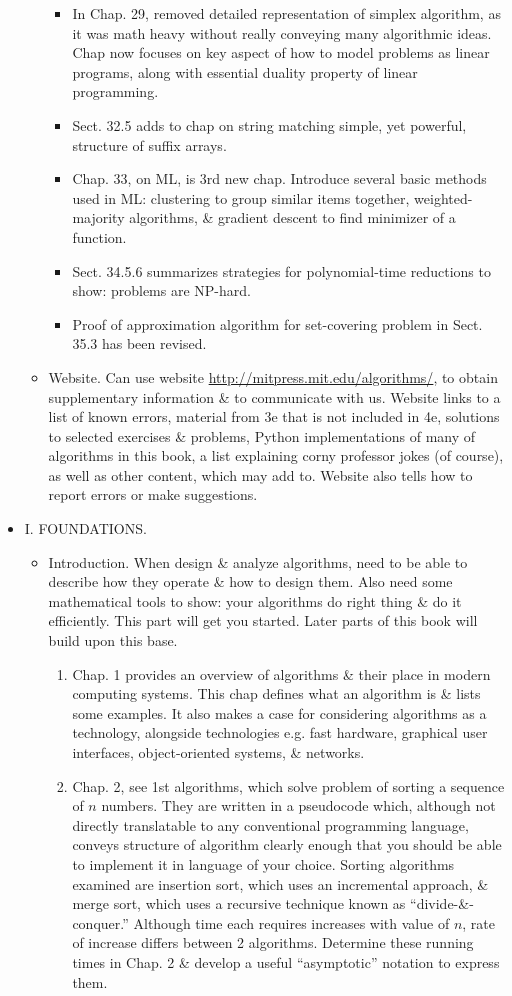 \documentclass{article}
\begin{document}
\begin{itemize}
\begin{itemize}
\begin{itemize}
			\item In Chap. 29, removed detailed representation of simplex algorithm, as it was math heavy without really conveying many algorithmic ideas. Chap now focuses on key aspect of how to model problems as linear programs, along with essential duality property of linear programming.
			\item Sect. 32.5 adds to chap on string matching simple, yet powerful, structure of suffix arrays.
			\item Chap. 33, on ML, is 3rd new chap. Introduce several basic methods used in ML: clustering to group similar items together, weighted-majority algorithms, \& gradient descent to find minimizer of a function.
			\item Sect. 34.5.6 summarizes strategies for polynomial-time reductions to show: problems are NP-hard.
			\item Proof of approximation algorithm for set-covering problem in Sect. 35.3 has been revised.
		\end{itemize}
		\item {\sf Website.} Can use website \url{http://mitpress.mit.edu/algorithms/}, to obtain supplementary information \& to communicate with us. Website links to a list of known errors, material from 3e that is not included in 4e, solutions to selected exercises \& problems, Python implementations of many of algorithms in this book, a list explaining corny professor jokes (of course), as well as other content, which may add to. Website also tells how to report errors or make suggestions.
	\end{itemize}
	\item {\sf I. FOUNDATIONS.}
	\begin{itemize}
		\item {\sf Introduction.} When design \& analyze algorithms, need to be able to describe how they operate \& how to design them. Also need some mathematical tools to show: your algorithms do right thing \& do it efficiently. This part will get you started. Later parts of this book will build upon this base.
		\begin{enumerate}
			\item Chap. 1 provides an overview of algorithms \& their place in modern computing systems. This chap defines what an algorithm is \& lists some examples. It also makes a case for considering algorithms as a technology, alongside technologies e.g. fast hardware, graphical user interfaces, object-oriented systems, \& networks.
			\item Chap. 2, see 1st algorithms, which solve problem of sorting a sequence of $n$ numbers. They are written in a pseudocode which, although not directly translatable to any conventional programming language, conveys structure of algorithm clearly enough that you should be able to implement it in language of your choice. Sorting algorithms examined are insertion sort, which uses an incremental approach, \& merge sort, which uses a recursive technique known as ``divide-\&-conquer.'' Although time each requires increases with value of $n$, rate of increase differs between 2 algorithms. Determine these running times in Chap. 2 \& develop a useful ``asymptotic'' notation to express them.

\end{enumerate}
\end{itemize}
\end{itemize}
\end{document}
